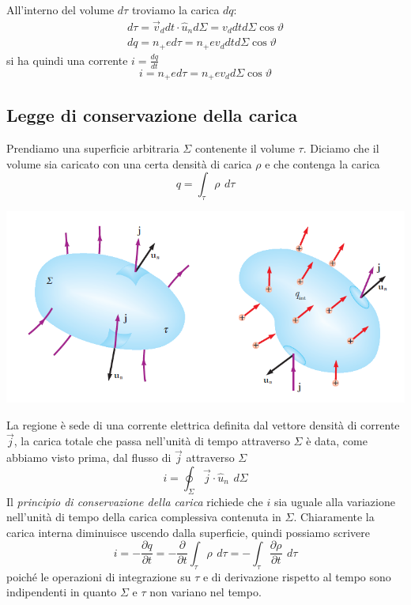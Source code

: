 \documentclass[x11names]{report}
\begin{document}
All'interno del volume \(d\tau\) troviamo la carica \(dq\):
\begin{gather*}
	d\tau = \vec{v}_d dt \cdot \hat{u}_n d\Sigma = v_d dt d\Sigma \cos\vartheta \\
	dq = n_+ e d\tau = n_+ e v_d dt d\Sigma \cos\vartheta
\end{gather*}
si ha quindi una corrente \(i = \frac{dq}{dt}\) 
\[
i =  n_+ e d\tau = n_+ e v_d  d\Sigma \cos\vartheta
\]

\subsection{Legge di conservazione della carica}
Prendiamo una superficie arbitraria \(\Sigma\) contenente il volume \(\tau\). Diciamo che il volume sia caricato con una certa densità di carica \(\rho\) e che contenga la carica
\[
q = \int_\tau \rho \,\ d\tau
\]
\begin{center}
	\includegraphics[scale=0.5]{img/cons_carica.png}
\end{center}
La regione è sede di una corrente elettrica definita dal vettore densità di corrente \(\vec{j}\), la carica totale che passa nell'unità di tempo attraverso \(\Sigma\) è data, come abbiamo visto prima, dal flusso di \(\vec{j}\) attraverso \(\Sigma\)
\[
i = \oint_{\Sigma} \vec{j}\cdot \hat{u}_n \,\ d\Sigma
\]
Il \textit{principio di conservazione della carica} richiede che \(i\) sia uguale alla variazione nell'unità di tempo della carica complessiva contenuta in \(\Sigma\). Chiaramente la carica interna diminuisce uscendo dalla superficie, quindi possiamo scrivere
\[
i = - \frac{\partial q}{\partial t} = -\frac{\partial}{\partial t}\int_\tau \rho \,\ d\tau = -\int_\tau \frac{\partial\rho}{\partial t} \,\ d\tau
\]
poiché le operazioni di integrazione su \(\tau\) e di derivazione rispetto al tempo sono indipendenti in quanto \(\Sigma\) e \(\tau\) non variano nel tempo.
\end{document}
